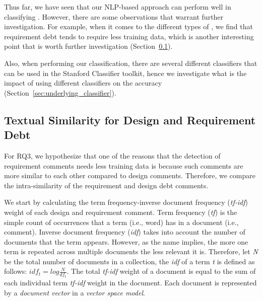 Thus far, we have seen that our NLP-based approach can perform well in classifying \SATD. However, there are some observations that warrant further investigation. For example, when it comes to the different types of \SATD, we find that requirement debt tends to require less training data, which is another interesting point that is worth further investigation (Section~\ref{sec:textual_similarity}). 


Also, when performing our classification, there are several different classifiers that can be used in the Stanford Classifier toolkit, hence we investigate what is the impact of using different classifiers on the accuracy (Section~\ref{sec:underlying_classifier}).


\subsection{Textual Similarity for Design and Requirement Debt}
\label{sec:textual_similarity}
For RQ3, we hypothesize that one of the reasons that the detection of requirement \SATD comments needs less training data is because such comments are more similar to each other compared to design \SATD comments. Therefore, we compare the intra-similarity of the requirement and design debt comments.

We start by calculating the term frequency-inverse document frequency (\textit{tf-idf}) weight of each design and requirement \SATD comment. Term frequency (\textit{tf}) is the simple count of occurrences that a term (i.e., word) has in a document (i.e., comment). Inverse document frequency (\textit{idf}) takes into account the number of documents that the term appears. However, as the name implies, the more one term is repeated across multiple documents the less relevant it is. Therefore, let \textit{N} be the total number of documents in a collection, the \textit{idf} of a term \textit{t} is defined as follows: \(idf_{t} = log\frac{N}{df_{t}}\). The total \textit{tf-idf} weight of a document is equal to the sum of each individual term \textit{tf-idf} weight in the document. Each document is represented by a \textit{document vector} in a \textit{vector space model}. 

